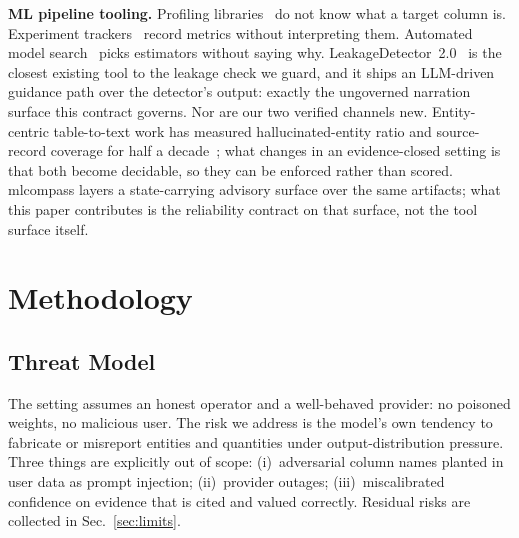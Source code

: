 \documentclass[conference]{IEEEtran}
\begin{document}
\textbf{ML pipeline tooling.} Profiling libraries~\cite{ydata} do not know what a target column is. Experiment trackers~\cite{mlflow,tensorflow} record metrics without interpreting them. Automated model search~\cite{autosklearn} picks estimators without saying why. LeakageDetector~2.0~\cite{truong2025leakagedetector} is the closest existing tool to the leakage check we guard, and it ships an LLM-driven guidance path over the detector's output: exactly the ungoverned narration surface this contract governs. Nor are our two verified channels new. Entity-centric table-to-text work has measured hallucinated-entity ratio and source-record coverage for half a decade~\cite{liu2021entitycentric,dhingra2019parent}; what changes in an evidence-closed setting is that both become decidable, so they can be enforced rather than scored. mlcompass layers a state-carrying advisory surface over the same artifacts; what this paper contributes is the reliability contract on that surface, not the tool surface itself.

\section{Methodology}
\subsection{Threat Model}
The setting assumes an honest operator and a well-behaved provider: no poisoned weights, no malicious user. The risk we address is the model's own tendency to fabricate or misreport entities and quantities under output-distribution pressure. Three things are explicitly out of scope: (i)~adversarial column names planted in user data as prompt injection; (ii)~provider outages; (iii)~miscalibrated confidence on evidence that is cited and valued correctly. Residual risks are collected in Sec.~\ref{sec:limits}.
\end{document}
